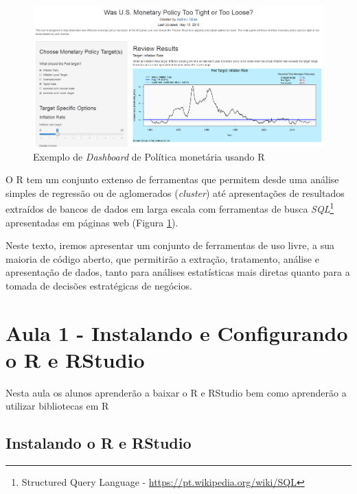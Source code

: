 \documentclass[12pt,a4paper,oneside]{erdc}
\begin{document}
\begin{figure}
	\centering
	\includegraphics[width=\linewidth]{../figs/f-Intro-01-Monetary-Policy}
	\caption{Exemplo de \textit{Dashboard} de Política monetária usando R \cite{Showmeshiny2019}}
	\label{fig:f-intro-01}
\end{figure}

O R tem um conjunto extenso de ferramentas que permitem desde uma análise simples de regressão ou de aglomerados (\textit{cluster}) até apresentações de resultados extraídos de bancos de dados em larga escala com ferramentas de busca \textit{SQL}\footnote{Structured Query Language - \url{https://pt.wikipedia.org/wiki/SQL}} apresentadas em páginas web (Figura \ref{fig:f-intro-01}).

Neste texto, iremos apresentar um conjunto de ferramentas de uso livre, a sua maioria de código aberto, que permitirão a extração, tratamento, análise e apresentação de dados, tanto para análises estatísticas mais diretas quanto para a tomada de decisões estratégicas de negócios.


%
%


%
%
%


\chapter{Aula 1 - Instalando e Configurando o R e RStudio}


Nesta aula os alunos aprenderão a baixar o R e RStudio bem como aprenderão a utilizar bibliotecas em R


\section{Instalando o R e RStudio}
\end{document}
